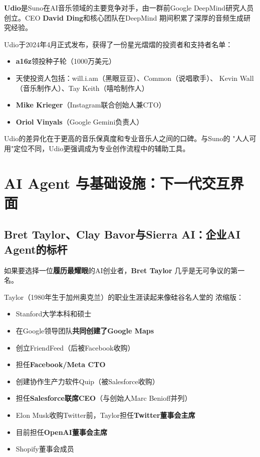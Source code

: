 \textbf{Udio}是Suno在AI音乐领域的主要竞争对手，由一群前Google
DeepMind研究人员创立。CEO \textbf{David Ding}和核心团队在DeepMind
期间积累了深厚的音频生成研究经验。

Udio于2024年4月正式发布，获得了一份星光熠熠的投资者和支持者名单：

\begin{itemize}
  \item \textbf{a16z}领投种子轮（1000万美元）
  \item 天使投资人包括：will.i.am（黑眼豆豆）、Common（说唱歌手）、
    Kevin Wall（音乐制作人）、Tay Keith（嘻哈制作人）
  \item \textbf{Mike Krieger}（Instagram联合创始人兼CTO）
  \item \textbf{Oriol Vinyals}（Google Gemini负责人）
\end{itemize}

Udio的差异化在于更高的音乐保真度和专业音乐人之间的口碑。与Suno的
"人人可用"定位不同，Udio更强调成为专业创作流程中的辅助工具。


\section{AI Agent 与基础设施：下一代交互界面}
\label{sec:founders-agents}

\subsection{Bret Taylor、Clay Bavor与Sierra AI：企业AI Agent的标杆}
\label{subsec:founders-sierra}

如果要选择一位\textbf{履历最耀眼}的AI创业者，\textbf{Bret Taylor}
几乎是无可争议的第一名。

Taylor（1980年生于加州奥克兰）的职业生涯读起来像硅谷名人堂的
浓缩版：

\begin{itemize}
  \item Stanford大学本科和硕士
  \item 在Google领导团队\textbf{共同创建了Google Maps}
  \item 创立FriendFeed（后被Facebook收购）
  \item 担任\textbf{Facebook/Meta CTO}
  \item 创建协作生产力软件Quip（被Salesforce收购）
  \item 担任\textbf{Salesforce联席CEO}（与创始人Marc Benioff并列）
  \item Elon Musk收购Twitter前，Taylor担任\textbf{Twitter董事会主席}
  \item 目前担任\textbf{OpenAI董事会主席}
  \item Shopify董事会成员
\end{itemize}

